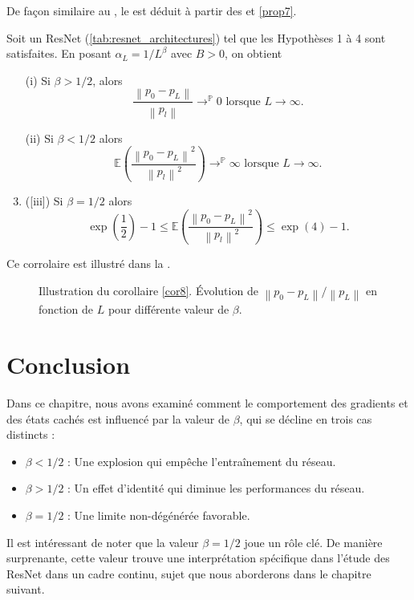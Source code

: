 De façon similaire au , le  est déduit à partir des  et \ref{prop7}.

\begin{cor}\label{cor8}
    Soit un ResNet (\ref{tab:resnet_architectures}) tel que les Hypothèses 1 à 4 sont satisfaites. En posant $ \alpha _L = 1 / L^\beta $ avec $ B > 0 $, on obtient 
    \begin{enumerate}
        \item [(i)] Si $ \beta > 1/2 $, alors 
        \[
            \frac{\left\| p_0 - p_L \right\| }{\left\| p_l \right\|  } \to ^\mathbb{P} 0 \text{ lorsque } L \to \infty
        .\]
        \item [(ii)] Si $ \beta < 1/2 $ alors 
        \[
            \mathbb{E}(\frac{\left\| p_0 - p_L \right\| ^2 }{\left\| p_l \right\| ^2 }) \to ^\mathbb{P} \infty \text{ lorsque } L \to \infty
        .\]
        \item ([iii]) Si $ \beta = 1/2 $ alors
        \[
            \exp (\frac{1}{2}) - 1 \leq \mathbb{E}(\frac{\left\| p_0 - p_L \right\| ^2 }{\left\| p_l \right\| ^2 }) \leq \exp (4) - 1
        .\]
    \end{enumerate}
    Ce corrolaire est illustré dans la .
\end{cor}

\begin{figure}[H]
    \centering
    \caption{Illustration du corollaire \ref{cor8}. Évolution de $ \left\| p_0 - p_L \right\| / \left\| p_L \right\| $ en fonction de $ L $ pour différente valeur de $ \beta  $.}
    \label{fig:cor8}
\end{figure}

\section{Conclusion}
Dans ce chapitre, nous avons examiné comment le comportement des gradients et des états cachés est influencé par la valeur de $\beta$, qui se décline en trois cas distincts :
\begin{itemize}
    \item $\beta < 1/2$ : Une explosion qui empêche l'entraînement du réseau.
    \item $\beta > 1/2$ : Un effet d'identité qui diminue les performances du réseau.
    \item $\beta = 1/2$ : Une limite non-dégénérée favorable.
\end{itemize}
Il est intéressant de noter que la valeur $\beta = 1/2$ joue un rôle clé. De manière surprenante, cette valeur trouve une interprétation spécifique dans l'étude des ResNet dans un cadre continu, sujet que nous aborderons dans le chapitre suivant.
